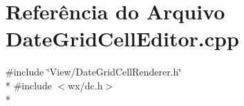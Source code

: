 \section{Referência do Arquivo Date\+Grid\+Cell\+Editor.\+cpp}
\label{_date_grid_cell_editor_8cpp}
{\ttfamily \#include \char`\"{}View/\+Date\+Grid\+Cell\+Renderer.\+h\char`\"{}}\\*
{\ttfamily \#include $<$wx/dc.\+h$>$}\\*
